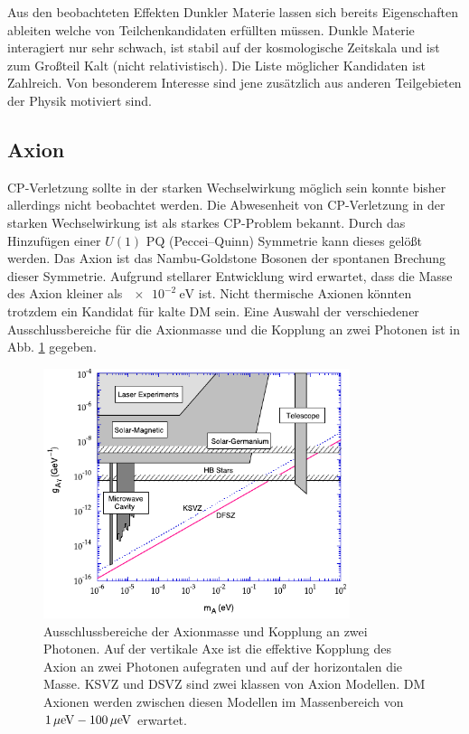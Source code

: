 Aus den beobachteten Effekten Dunkler Materie lassen sich bereits Eigenschaften ableiten welche von Teilchenkandidaten erfüllten müssen.
Dunkle Materie interagiert nur sehr schwach, ist stabil auf der kosmologische Zeitskala und ist zum Großteil Kalt (nicht relativistisch).
Die Liste möglicher Kandidaten ist Zahlreich.
Von besonderem Interesse sind jene zusätzlich aus anderen Teilgebieten der Physik motiviert sind.

\subsection*{Axion}
CP-Verletzung sollte in der starken Wechselwirkung möglich sein konnte bisher allerdings nicht beobachtet werden.
Die Abwesenheit von CP-Verletzung in der starken Wechselwirkung ist als starkes CP-Problem bekannt.
Durch das Hinzufügen einer $U(1)$ PQ (Peccei–Quinn) Symmetrie kann dieses gelößt werden.\cite{Peccey1977}
Das Axion ist das Nambu-Goldstone Bosonen der spontanen Brechung dieser Symmetrie.
Aufgrund stellarer Entwicklung wird erwartet, dass die Masse des Axion kleiner als $\SI{e-2}{\electronvolt}$\cite{Raffelt1999} ist.
Nicht thermische Axionen könnten trotzdem ein Kandidat für kalte DM sein.\cite{Drees2012}
Eine Auswahl der verschiedener Ausschlussbereiche für die Axionmasse und die Kopplung an zwei Photonen ist in Abb. \ref{fig:AxionExclusion} gegeben.

\begin{figure}[!b]
\begin{center}
\includegraphics[width=0.8\textwidth]{./fig/AxionExclusion.pdf}
\end{center}
\caption{Ausschlussbereiche der Axionmasse und Kopplung an zwei Photonen.
Auf der vertikale Axe ist die effektive Kopplung des Axion an zwei Photonen aufegraten und auf der horizontalen die Masse.
KSVZ und DSVZ sind zwei klassen von Axion Modellen.
DM Axionen werden zwischen diesen Modellen im Massenbereich von $\SI{1}{\mu\electronvolt}\--\SI{100}{\mu\electronvolt}$ erwartet.\cite{Rosenberg2010}}
\label{fig:AxionExclusion}
\end{figure}


